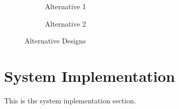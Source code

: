 \documentclass{article}
\begin{document}
\begin{figure}[ht]\centering\begin{subfigure}[b]{4.5cm}\caption{Alternative 1}\label{Fig:alt1} \end{subfigure}
%
\hspace{1cm}
%
\begin{subfigure}[b]{4.5cm}\centering {}\caption{Alternative 2} \label{Fig:alt2} \end{subfigure}\caption{Alternative Designs}\label{fig:altDesigns} \end{figure}


\section{System Implementation} \todo{}
This is the system inplementation section.
\end{document}
